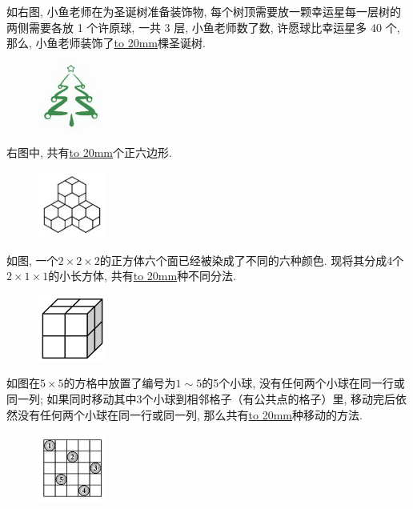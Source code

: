 \item {
    如右图, 小鱼老师在为圣诞树准备装饰物, 每个树顶需要放一颗幸运星每一层树的两侧需要各放 1 个许原球, 一共 3 层, 小鱼老师数了数, 许愿球比幸运星多 40 个, 那么, 小鱼老师装饰了\underline{\hbox to 20mm{}}棵圣诞树.
    \begin{figure}[H] 
        \centering
        \includegraphics[width=0.2\textwidth]{./pics/Chapter_6/13.png}
    \end{figure}
}

\item {
    右图中, 共有\underline{\hbox to 20mm{}}个正六边形.
    \begin{figure}[H] 
        \centering
        \includegraphics[width=0.2\textwidth]{./pics/Chapter_6/14.png}
    \end{figure}
}

\item {
    如图, 一个$2\times 2\times 2$的正方体六个面已经被染成了不同的六种颜色. 现将其分成4个$2\times 1\times 1$的小长方体, 共有\underline{\hbox to 20mm{}}种不同分法.
    \begin{figure}[H] 
        \centering
        \includegraphics[width=0.2\textwidth]{./pics/Chapter_6/15.png}
    \end{figure}
}

\item {
    如图在$5\times 5$的方格中放置了编号为$1\sim 5$的5个小球, 没有任何两个小球在同一行或同一列; 如果同时移动其中3个小球到相邻格子（有公共点的格子）里, 移动完后依然没有任何两个小球在同一行或同一列, 那么共有\underline{\hbox to 20mm{}}种移动的方法.
    \begin{figure}[H] 
        \centering
        \includegraphics[width=0.2\textwidth]{./pics/Chapter_6/23.png}
    \end{figure}
}

